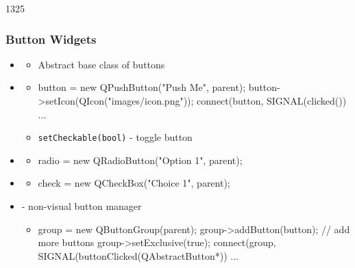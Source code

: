 \begin{slide}[fragile]{1325}
  \frametitle{Button Widgets}
 \begin{itemize}
  \item \textbf{}
    \begin{itemize}
    \item Abstract base class of buttons
   \end{itemize}
  \item \textbf{}
    \begin{itemize}
    \item[]
      \begin{cpp}
button = new QPushButton("Push Me", parent);
button->setIcon(QIcon("images/icon.png"));
connect(button, SIGNAL(clicked()) ...
      \end{cpp}
    \item \texttt{setCheckable(bool)} - toggle button
    \end{itemize}
 \item \textbf{}
   \begin{itemize}
   \item[]
     \begin{cpp}
radio = new QRadioButton("Option 1", parent);
     \end{cpp}
   \end{itemize}
  \item \textbf{}
    \begin{itemize}
     \item[] \begin{cpp}
check = new QCheckBox("Choice 1", parent);
     \end{cpp}
  \end{itemize}
  \item \textbf{} - non-visual button manager
    \begin{itemize}
   \item[]
     \begin{cpp}
group = new QButtonGroup(parent);
group->addButton(button); // add more buttons
group->setExclusive(true);
connect(group, SIGNAL(buttonClicked(QAbstractButton*)) ...
     \end{cpp}
   \end{itemize}
  \end{itemize}
\end{slide}

